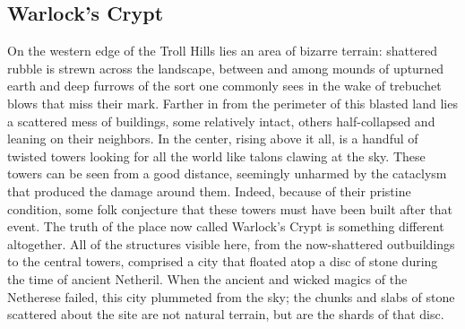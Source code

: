 \documentclass[10pt,a4paper,twoside,twocolumn,openany,bg=print,nodeprecatedcode]{dndbook}
\begin{document}
\subsection{Warlock's Crypt}
On the western edge of the Troll Hills lies an area of bizarre terrain: shattered rubble is strewn across the landscape, between and among mounds of upturned earth and deep furrows of the sort one commonly sees in the wake of trebuchet blows that miss their mark. Farther in from the perimeter of this blasted land lies a scattered mess of buildings, some relatively intact, others half-collapsed and leaning on their neighbors.
In the center, rising above it all, is a handful of twisted towers looking for all the world like talons clawing at the sky. These towers can be seen from a good distance, seemingly unharmed by the cataclysm that produced the damage around them. Indeed, because of their pristine condition, some folk conjecture that these towers must have been built after that event.
The truth of the place now called Warlock's Crypt is something different altogether. All of the structures visible here, from the now-shattered outbuildings to the central towers, comprised a city that floated atop a disc of stone during the time of ancient Netheril. When the ancient and wicked magics of the Netherese failed, this city plummeted from the sky; the chunks and slabs of stone scattered about the site are not natural terrain, but are the shards of that disc.
\end{document}
